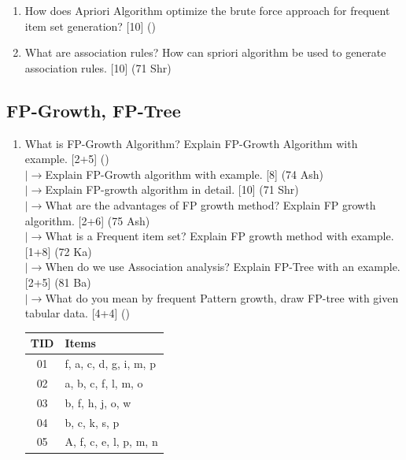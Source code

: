 \documentclass[12pt]{article}
\newcommand{\lb}{\\$\left|\rightarrow\right.$}
\begin{document}
\begin{enumerate}[topsep=0pt, noitemsep]
      \item How does Apriori Algorithm optimize the brute force approach for frequent item set generation? \hfill [10] ()

      \item What are association rules? How can spriori algorithm be used to generate association rules. \hfill [10] (71 Shr)
    \end{enumerate}

  \subsection{FP-Growth, FP-Tree}
    \begin{enumerate}[topsep=0pt, noitemsep]
      \item What is FP-Growth Algorithm? Explain FP-Growth Algorithm with example. \hfill [2+5] ()
        \lb Explain FP-Growth algorithm with example. \hfill [8] (74 Ash)
        \lb Explain FP-growth algorithm in detail. \hfill [10] (71 Shr)
        \lb What are the advantages of FP growth method? Explain FP growth algorithm. \hfill [2+6] (75 Ash)
        \lb What is a Frequent item set? Explain FP growth method with example. \hfill [1+8] (72 Ka)
        \lb When do we use Association analysis? Explain FP-Tree with an example. \hfill [2+5] (81 Ba)
        \lb What do you mean by frequent Pattern growth, draw FP-tree with given tabular data. \hfill [4+4] ()\\
        \small
        \begin{tabular}{|c|l|}
          \hline
          TID & Items \\ \hline
          01 & f, a, c, d, g, i, m, p \\ \hline
          02 & a, b, c, f, l, m, o \\ \hline
          03 & b, f, h, j, o, w \\ \hline
          04 & b, c, k, s, p \\ \hline
          05 & A, f, c, e, l, p, m, n \\ \hline
        \end{tabular}
        \normalsize


\end{enumerate}
\end{document}

